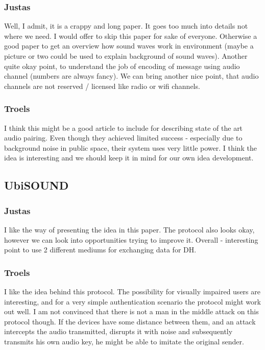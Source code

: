 \documentclass[12pt]{article}
\begin{document}
\subsubsection{Justas}
\label{subs:Justas}

Well, I admit, it is a crappy and long paper. It goes too much into details not where we need. I would offer to skip this paper for sake of everyone.
Otherwise a good paper to get an overview how sound waves work in environment (maybe a picture or two could be used to explain background of sound waves).
Another quite okay point, to understand the job of encoding of message using audio channel (numbers are always fancy).
We can bring another nice point, that audio channels are not reserved / licensed like radio or wifi channels.

\subsubsection{Troels}
\label{subs:Troels}

I think this might be a good article to include for describing state of the art audio pairing. Even though they achieved limited success - especially due to background noise in public space, their system uses very little power. I think the idea is interesting and we should keep it in mind for our own idea development.

\subsection{UbiSOUND}
\label{sub:UbiSOUND}

\subsubsection{Justas}
\label{subs:Justas}

I like the way of presenting the idea in this paper. The protocol also looks okay, however we can look into opportunities trying to improve it.
Overall - interesting point to use 2 different mediums for exchanging data for DH.

\subsubsection{Troels}
\label{subs:Troels}

I like the idea behind this protocol. The possibility for visually impaired users are interesting, and for a very simple authentication scenario the protocol might work out well. I am not convinced that there is not a man in the middle attack on this protocol though. If the devices have some distance between them, and an attack intercepts the audio transmitted, disrupts it with noise and subsequently transmits his own audio key, he might be able to imitate the original sender.
\end{document}
